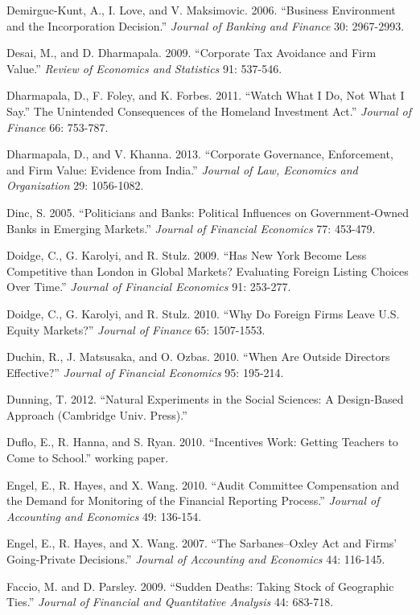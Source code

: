 \noindent Demirguc-Kunt, A., I. Love, and V. Maksimovic. 2006. ``Business Environment and the Incorporation Decision.''  \textit{Journal of Banking and Finance }30: 2967-2993.

\noindent Desai, M., and D. Dharmapala. 2009. ``Corporate Tax Avoidance and Firm Value.''  \textit{Review of Economics and Statistics }91: 537-546.

\noindent Dharmapala, D., F. Foley, and K. Forbes. 2011. ``Watch What I Do, Not What I Say.'' The Unintended Consequences of the Homeland Investment Act.''  \textit{Journal of Finance} 66: 753-787.

\noindent Dharmapala, D., and V. Khanna. 2013. ``Corporate Governance, Enforcement, and Firm Value:  Evidence from India.''  \textit{Journal of Law, Economics and Organization} 29: 1056-1082.

\noindent Dinc, S. 2005. ``Politicians and Banks:  Political Influences on Government-Owned Banks in Emerging Markets.''  \textit{Journal of Financial Economics} 77: 453-479.

\noindent Doidge, C., G. Karolyi, and R. Stulz. 2009. ``Has New York Become Less Competitive than London in Global Markets?  Evaluating Foreign Listing Choices Over Time.''  \textit{Journal of Financial Economics} 91: 253-277.

\noindent Doidge, C., G. Karolyi, and R. Stulz. 2010. ``Why Do Foreign Firms Leave U.S. Equity Markets?'' \textit{Journal of Finance} 65: 1507-1553.

\noindent Duchin, R., J. Matsusaka, and O. Ozbas. 2010. ``When Are Outside Directors Effective?'' \textit{Journal of Financial Economics} 95: 195-214.

\noindent Dunning, T. 2012. ``Natural Experiments in the Social Sciences:  A Design-Based Approach (Cambridge Univ. Press).''

\noindent Duflo, E., R. Hanna, and S. Ryan. 2010. ``Incentives Work:  Getting Teachers to Come to School.'' working paper.

\noindent Engel, E., R. Hayes, and X. Wang. 2010. ``Audit Committee Compensation and the Demand for Monitoring of the Financial Reporting Process.'' \textit{Journal of Accounting and Economics} 49: 136-154.

\noindent Engel, E., R. Hayes, and X. Wang. 2007. ``The Sarbanes--Oxley Act and Firms' Going-Private Decisions.'' \textit{Journal of Accounting and Economics} 44: 116-145.

\noindent Faccio, M. and D. Parsley. 2009. ``Sudden Deaths: Taking Stock of Geographic Ties.'' \textit{Journal of} \textit{Financial and Quantitative Analysis} 44: 683-718. 

